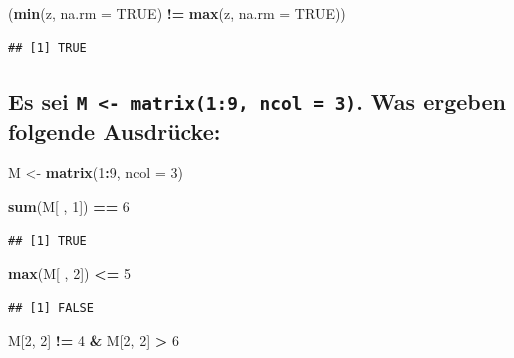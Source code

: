 \documentclass[12pt,a4paper]{article}
\newenvironment{Shaded}{\begin{snugshade}}{\end{snugshade}}
\newcommand{\AttributeTok}[1]{\textcolor[rgb]{0.13,0.29,0.53}{#1}}
\newcommand{\ConstantTok}[1]{\textcolor[rgb]{0.56,0.35,0.01}{#1}}
\newcommand{\DecValTok}[1]{\textcolor[rgb]{0.00,0.00,0.81}{#1}}
\newcommand{\FunctionTok}[1]{\textcolor[rgb]{0.13,0.29,0.53}{\textbf{#1}}}
\newcommand{\NormalTok}[1]{#1}
\newcommand{\OtherTok}[1]{\textcolor[rgb]{0.56,0.35,0.01}{#1}}
\newcommand{\SpecialCharTok}[1]{\textcolor[rgb]{0.81,0.36,0.00}{\textbf{#1}}}
\begin{document}
\begin{Shaded}
\begin{Highlighting}[]
\NormalTok{    (}\FunctionTok{min}\NormalTok{(z, }\AttributeTok{na.rm =} \ConstantTok{TRUE}\NormalTok{) }\SpecialCharTok{!=} \FunctionTok{max}\NormalTok{(z, }\AttributeTok{na.rm =} \ConstantTok{TRUE}\NormalTok{))}
\end{Highlighting}
\end{Shaded}

\begin{verbatim}
## [1] TRUE
\end{verbatim}

\subsection{\texorpdfstring{Es sei
\texttt{M\ \textless{}-\ matrix(1:9,\ ncol\ =\ 3)}. Was ergeben folgende
Ausdrücke:}{Es sei M \textless- matrix(1:9, ncol = 3). Was ergeben folgende Ausdrücke:}}\label{es-sei-m---matrix19-ncol-3.-was-ergeben-folgende-ausdruxfccke}

\begin{Shaded}
\begin{Highlighting}[]
\NormalTok{    M }\OtherTok{\textless{}{-}} \FunctionTok{matrix}\NormalTok{(}\DecValTok{1}\SpecialCharTok{:}\DecValTok{9}\NormalTok{, }\AttributeTok{ncol =} \DecValTok{3}\NormalTok{)}
    
    \FunctionTok{sum}\NormalTok{(M[ , }\DecValTok{1}\NormalTok{]) }\SpecialCharTok{==} \DecValTok{6}
\end{Highlighting}
\end{Shaded}

\begin{verbatim}
## [1] TRUE
\end{verbatim}

\begin{Shaded}
\begin{Highlighting}[]
    \FunctionTok{max}\NormalTok{(M[ , }\DecValTok{2}\NormalTok{]) }\SpecialCharTok{\textless{}=} \DecValTok{5}
\end{Highlighting}
\end{Shaded}

\begin{verbatim}
## [1] FALSE
\end{verbatim}

\begin{Shaded}
\begin{Highlighting}[]
\NormalTok{    M[}\DecValTok{2}\NormalTok{, }\DecValTok{2}\NormalTok{] }\SpecialCharTok{!=} \DecValTok{4} \SpecialCharTok{\&}\NormalTok{ M[}\DecValTok{2}\NormalTok{, }\DecValTok{2}\NormalTok{] }\SpecialCharTok{\textgreater{}} \DecValTok{6}
\end{Highlighting}
\end{Shaded}
\end{document}
